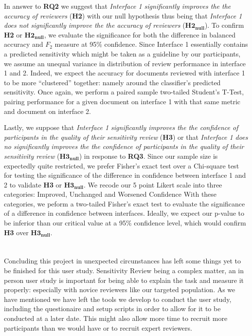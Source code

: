 \documentclass[\version]{l4proj}
\begin{document}
In answer to \textbf{RQ2} we suggest that \textit{Interface 1 significantly improves the the accuracy of reviewers} (\textbf{H2}) with our null hypothesis thus being that \textit{Interface 1 does not significantly improve the the accuracy of reviewers} (\(\mathbf{H2_{null}}\)).
To confirm \textbf{H2} or \(\mathbf{H2_{null}}\), we evaluate the significance for both the difference in balanced accuracy and \(F_{2}\) measure at 95\% confidence.
Since Interface 1 essentially contains a predicted sensitivity which might be taken as a guideline by our participants, we assume an unequal variance in distribution of review performance in interface 1 and 2.
Indeed, we expect the accuracy for documents reviewed with interface 1 to be more ``clustered'' together: namely around the classifier's predicted sensitivity.
Once again, we perform a paired sample two-tailed Student's T-Test, pairing performance for a given document on interface 1 with that same metric and document on interface 2.

Lastly, we suppose that \textit{Interface 1 significantly improves the the confidence of participants in the quality of their sensitivity review} (\textbf{H3}) or that \textit{Interface 1 does no significantly improves the the confidence of participants in the quality of their sensitivity review} (\(\mathbf{H3_{null}}\)) in response to \textbf{RQ3}.
Since our sample size is expectedly quite restricted, we prefer Fisher's exact test over a Chi-square test for testing the significance of the difference in confidence between interface 1 and 2 to validate \textbf{H3} or \(\mathbf{H3_{null}}\).
We recode our 5 point Likert scale into three categories: Improved, Unchanged and Worsened Confidence
%
With these categories, we peform a two-tailed Fisher's exact test to evaluate the significance of a difference in confidence between interfaces.
Ideally, we expect our p-value to be inferior than our critical value at a 95\% confidence level, which would confirm \textbf{H3} over \(\mathbf{H3_{null}}\).

\section*{}

Concluding this project in unexpected circunstances has left some things yet to be finished for this user study.
Sensitivity Review being a complex matter, an in person user study is important for being able to explain the task and measure it properly: especially with novice reviewers like our targeted population.
As we have mentioned we have left the tools we develop to conduct the user study, including the questionaire and setup scripts in order to allow for it to be conducted at a later date.
This might also allow more time to recruit more participants than we would have or to recruit expert reviewers.
\end{document}
